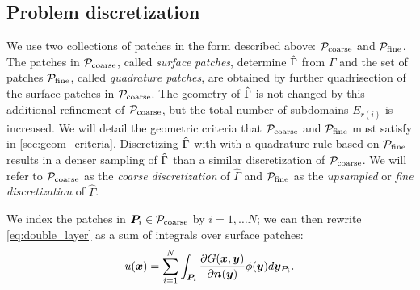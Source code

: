 

\subsection{Problem discretization \label{sec:discretization}}
We use two collections of patches in the form described above: ${\mathcal{P}_{\mathrm{coarse}}}$ and ${\mathcal{P}_{\mathrm{fine}}}$.
The patches in ${\mathcal{P}_{\mathrm{coarse}}}$, called \emph{surface patches}, determine $\hat{\Gamma}$ from $\Gamma$ and the set of patches ${\mathcal{P}_{\mathrm{fine}}}$, called \emph{quadrature patches}, are obtained by further quadrisection of the surface patches in ${\mathcal{P}_{\mathrm{coarse}}}$.
The geometry of $\hat{\Gamma}$ is not changed by this additional refinement of ${\mathcal{P}_{\mathrm{coarse}}}$, but the total number of subdomains $E_{r(i)}$ is increased.
We will detail the geometric criteria that ${\mathcal{P}_{\mathrm{coarse}}}$ and ${\mathcal{P}_{\mathrm{fine}}}$ must satisfy in \cref{sec:geom_criteria}.
Discretizing $\hat{\Gamma}$ with with a quadrature rule based on ${\mathcal{P}_{\mathrm{fine}}}$ results in a denser sampling of $\hat{\Gamma}$ than a similar discretization of ${\mathcal{P}_{\mathrm{coarse}}}$.
We will refer to ${\mathcal{P}_{\mathrm{coarse}}}$ as the \textit{coarse discretization} of $\hat{\Gamma}$ and ${\mathcal{P}_{\mathrm{fine}}}$ as the \textit{upsampled} or \textit{fine discretization} of $\hat{\Gamma}$.

We index the patches in ${\bm{P}}_i \in {\mathcal{P}_{\ensuremath{\mathrm{coarse}}}}$ by $i = 1,\hdots N$; we can then rewrite \cref{eq:double_layer} as a sum of integrals over surface patches:
\begin{equation}
  u({\bm{x}}) = \sum_{i=1}^N\int_{{\bm{P}}_i} \frac{\partial G({\bm{x}},{\bm{y}})}{\partial {\bm{n}}({\bm{y}})} \phi({\bm{y}}) d{\bm{y}}_{{\bm{P}}_i}.
  \label{eq:double_layer_patches} 
\end{equation}

